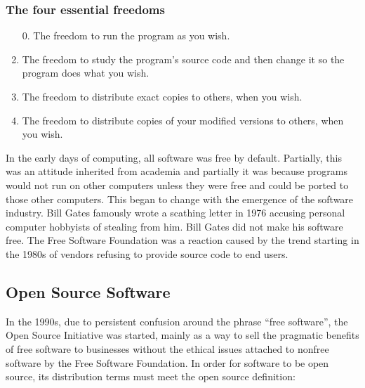\documentclass[12pt,letterpaper]{article}
\begin{document}
\subsubsection{The four essential freedoms}
\begin{enumerate}
\item[0.] The freedom to run the program as you wish.
\item The freedom to study the program's source code and then change it so the program does what you wish.
\item The freedom to distribute exact copies to others, when you wish.
\item The freedom to distribute copies of your modified versions to others, when you wish.
\end{enumerate}

 In the early days of computing, all software was free by default. Partially, this was an attitude inherited from academia and partially it was because programs would not run on other computers unless they were free and could be ported to those other computers. This began to change with the emergence of the software industry. Bill Gates famously wrote a scathing letter in  1976 accusing personal computer hobbyists of stealing from him. Bill Gates did not make his software free. The Free Software Foundation was a reaction caused by the trend starting in the 1980s of vendors refusing to provide source code to end users.

\subsection{Open Source Software}

In the 1990s, due to persistent confusion around the phrase ``free software'', the Open Source Initiative was started, mainly as a way to sell the pragmatic benefits of free software to businesses without the ethical issues attached to nonfree software by the Free Software Foundation. In order for software to be open source, its distribution terms must meet the open source definition:
\end{document}

